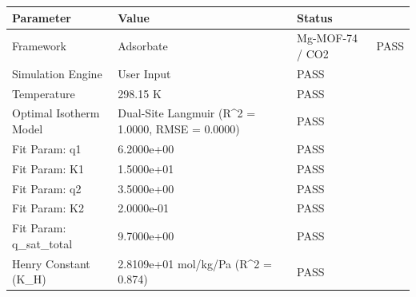 \begin{tabular}{lll}
\toprule
Parameter & Value & Status \\
\midrule
Framework & Adsorbate & Mg-MOF-74 / CO2 & PASS \\
Simulation Engine & User Input & PASS \\
Temperature & 298.15 K & PASS \\
Optimal Isotherm Model & Dual-Site Langmuir (R^2 = 1.0000, RMSE = 0.0000) & PASS \\
Fit Param: q1 & 6.2000e+00 & PASS \\
Fit Param: K1 & 1.5000e+01 & PASS \\
Fit Param: q2 & 3.5000e+00 & PASS \\
Fit Param: K2 & 2.0000e-01 & PASS \\
Fit Param: q_sat_total & 9.7000e+00 & PASS \\
Henry Constant (K_H) & 2.8109e+01 mol/kg/Pa (R^2 = 0.874) & PASS \\
\bottomrule
\end{tabular}
